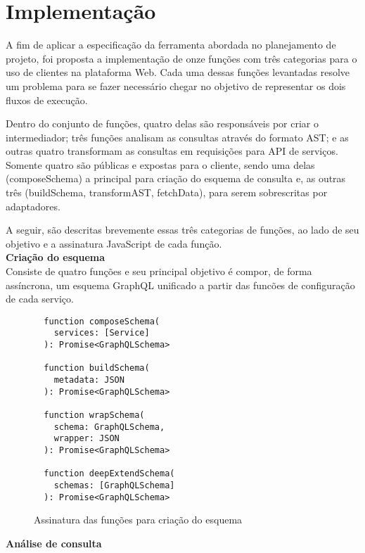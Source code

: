 \section{Implementação}

A fim de aplicar a especificação da ferramenta abordada no planejamento de projeto, foi proposta a implementação de onze funções com três categorias para o uso de clientes na plataforma Web. Cada uma dessas funções levantadas resolve um problema para se fazer necessário chegar no objetivo de representar os dois fluxos de execução.

Dentro do conjunto de funções, quatro delas são responsáveis por criar o intermediador; três funções analisam as consultas através do formato AST; e as outras quatro transformam as consultas em requisições para API de serviços. Somente quatro são públicas e expostas para o cliente, sendo uma delas (composeSchema) a principal para criação do esquema de consulta e, as outras três (buildSchema, transformAST, fetchData), para serem sobrescritas por adaptadores.

A seguir, são descritas brevemente essas três categorias de funções, ao lado de seu objetivo e a assinatura JavaScript de cada função. \\

\textbf{Criação do esquema} \\

Consiste de quatro funções e seu principal objetivo é compor, de forma assíncrona, um esquema GraphQL unificado a partir das funcões de configuração de cada serviço.

\begin{figure}[H]
  \centering
  \begin{verbatim}
  function composeSchema(
    services: [Service]
  ): Promise<GraphQLSchema>

  function buildSchema(
    metadata: JSON
  ): Promise<GraphQLSchema>

  function wrapSchema(
    schema: GraphQLSchema,
    wrapper: JSON
  ): Promise<GraphQLSchema>

  function deepExtendSchema(
    schemas: [GraphQLSchema]
  ): Promise<GraphQLSchema>
  \end{verbatim}
  \caption{Assinatura das funções para criação do esquema}
\end{figure}

\textbf{Análise de consulta} \\

